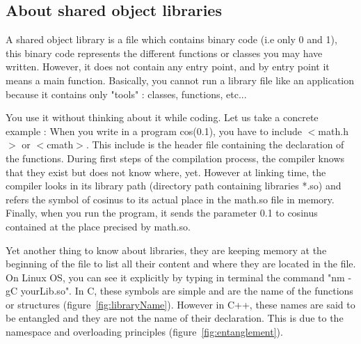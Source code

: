 \documentclass[10pt,a4paper]{report}
\begin{document}
\subsection*{About shared object libraries}
A shared object library is a file which contains binary code (i.e only 0 and 1), this binary code represents the different functions or classes you may have written. However, it does not contain any entry point, and by entry point it means a main function. Basically, you cannot run a library file like an application because it contains only "tools" : classes, functions, etc...\par
%
You use it without thinking about it while coding. Let us take a concrete example : When you write in a program cos(0.1), you have to include $<$math.h$>$ or $<$cmath$>$. This include is the header file containing the declaration of the functions. During first steps of the compilation process, the compiler knows that they exist but does not know where, yet. However at linking time, the compiler looks in its library path (directory path containing libraries *.so) and refers the symbol of cosinus to its actual place in the math.so file in memory. Finally, when you run the program, it sends the parameter 0.1 to cosinus contained at the place precised by math.so.\par
%
Yet another thing to know about libraries, they are keeping memory at the beginning of the file to list all their content and where they are located in the file. On Linux OS, you can see it explicitly by typing in terminal the command "nm -gC yourLib.so". In C, these symbols are simple and are the name of the functions or structures (figure~\ref{fig:libraryName}). However in C++, these names are said to be entangled and they are not the name of their declaration. This is due to the namespace and overloading principles (figure~\ref{fig:entanglement}).
%
\end{document}
